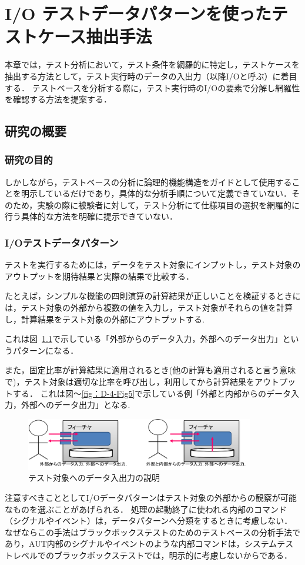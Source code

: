 
\chapter{I/O テストデータパターンを使ったテストケース抽出手法}\label{chap:4}
本章では，テスト分析において，テスト条件を網羅的に特定し，テストケースを抽出する方法として，テスト実行時のデータの入出力（以降I/Oと呼ぶ）に着目する．
テストベースを分析する際に，テスト実行時のI/Oの要素で分解し網羅性を確認する方法を提案する．
\newpage

\section{研究の概要} \label{sec:4-1}
\subsection{研究の目的} \label{sec:4-1-1}


しかしながら，テストベースの分析に論理的機能構造をガイドとして使用することを明示しているだけであり，具体的な分析手順について定義できていない．そのため，実験の際に被験者に対して，テスト分析にて仕様項目の選択を網羅的に行う具体的な方法を明確に提示できていない．

\subsection{I/Oテストデータパターン} \label{sec:4-1-1}
テストを実行するためには，データをテスト対象にインプットし，テスト対象のアウトプットを期待結果と実際の結果で比較する．

たとえば，シンプルな機能の四則演算の計算結果が正しいことを検証するときには，テスト対象の外部から複数の値を入力し，テスト対象がそれらの値を計算し，計算結果をテスト対象の外部にアウトプットする.

これは図~\ref{fig:D-3-Fig4}で示している「外部からのデータ入力，外部へのデータ出力」というパターンになる．

また，固定比率が計算結果に適用されるとき(他の計算も適用されると言う意味で)，テスト対象は適切な比率を呼び出し，利用してから計算結果をアウトプットする．
これは図〜\ref{fig：D-4-Fig5}で示している例「外部と内部からのデータ入力，外部へのデータ出力」となる.
\begin{figure}[htbp]
 \begin{center}
 \includegraphics[width=10cm]{./image/D-3-Fig4.png}
 \caption{テスト対象へのデータ入出力の説明}
 \label{fig:D-3-Fig4}
 \end{center}
\end{figure}
注意すべきこととしてI/Oデータパターンはテスト対象の外部からの観察が可能なものを選ぶことがあげられる．
処理の起動終了に使われる内部のコマンド（シグナルやイベント）は，データパターンへ分類をするときに考慮しない．
なぜならこの手法はブラックボックステストのためのテストベースの分析手法であり，AUT内部のシグナルやイベントのような内部コマンドは，システムテストレベルでのブラックボックステストでは，明示的に考慮しないからである．


